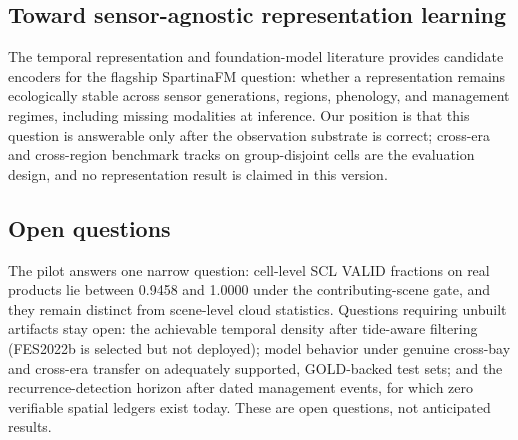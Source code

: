 \subsection{Toward sensor-agnostic representation learning}
The temporal representation and foundation-model literature
\citep{russwurm2020selfattn,garnot2020pixelset,cong2022satmae,fuller2023croma,jakubik2024prithvi,xiong2024dofa}
provides candidate encoders for the flagship SpartinaFM question:
whether a representation remains ecologically stable across sensor
generations, regions, phenology, and management regimes, including
missing modalities at inference. Our position is that this question is
answerable only after the observation substrate is correct; cross-era
and cross-region benchmark tracks on group-disjoint cells
\citep{tuia2016da,ploton2020spatial} are the evaluation design, and no
representation result is claimed in this version.

\subsection{Open questions}
The pilot answers one narrow question: cell-level SCL VALID fractions
on real products lie between 0.9458 and 1.0000 under the
contributing-scene gate, and they remain distinct from scene-level
cloud statistics. Questions requiring unbuilt artifacts stay open:
the achievable temporal density after tide-aware filtering
(FES2022b is selected but not deployed); model behavior under
genuine cross-bay and cross-era transfer on adequately supported,
GOLD-backed test sets; and the recurrence-detection horizon after
dated management events, for which zero verifiable spatial ledgers
exist today. These are open questions, not anticipated results.
